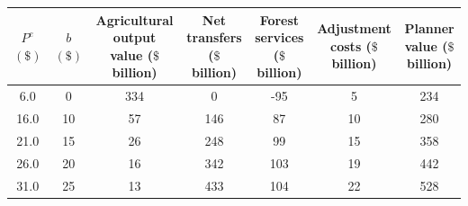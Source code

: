 \begin{tabular}{ccccccc}
\toprule
\makecell[c]{$P^e$ \\ $(\$)$} & \makecell[c]{$b$ \\ $(\$)$} & \makecell[c]{Agricultural \\ output value \\ ($\$$ billion)} & \makecell[c]{Net \\ transfers \\ ($\$$ billion)} & \makecell[c]{Forest \\ services \\ ($\$$ billion)} & \makecell[c]{Adjustment \\ costs \\ ($\$$ billion)} & \makecell[c]{Planner \\ value \\ ($\$$ billion)} \\
\midrule
 6.0 & 0 & 334 & 0 & -95 & 5 & 234 \\
 16.0 & 10 & 57 & 146 & 87 & 10 & 280 \\
 21.0 & 15 & 26 & 248 & 99 & 15 & 358 \\
 26.0 & 20 & 16 & 342 & 103 & 19 & 442 \\
 31.0 & 25 & 13 & 433 & 104 & 22 & 528 \\
\bottomrule
\end{tabular}
